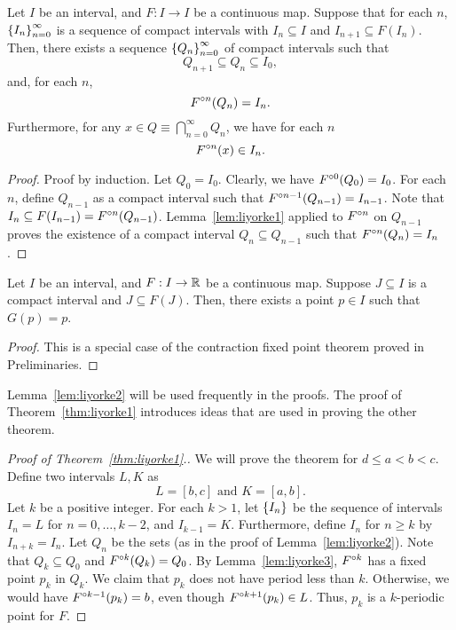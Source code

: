 \documentclass[12pt,draft,twoside]{book}
\begin{document}
\begin{lemma}
  Let $I$ be an interval, and $F: I\to I$ be a continuous map.
  Suppose that for each $n$, $\left \{ I_n \right \}^{\infty}_{n=0}$ is a sequence of compact intervals with $I_n \subseteq I$ and $I_{n+1} \subseteq F(I_n)$.
  Then, there exists a sequence $\left \{ Q_n \right \}^{\infty}_{n=0}$ of compact intervals such that 
  \begin{equation*}
    Q_{n+1} \subseteq Q_{n} \subseteq I_0,
  \end{equation*}
and, for each $n$,
  \begin{equation*}
    F^{\circ n}(Q_n) = I_n.
  \end{equation*}
  Furthermore, for any $x \in Q \equiv \bigcap\limits_{n=0}^{\infty}Q_n$, we have for each $n$
  \begin{equation*}
    F^{\circ n}(x) \in I_n.
  \end{equation*}
  \label{lem:liyorke2}
  \begin{proof}
    Proof by induction.
    Let $Q_0 = I_0$.
    Clearly, we have $F^{\circ 0}(Q_0) = I_0$.
    For each $n$, define $Q_{n-1}$ as a compact interval such that $F^{\circ n-1}(Q_{n-1}) = I_{n-1}$.
    Note that $I_n \subseteq F(I_{n-1}) = F^{\circ n}(Q_{n-1})$.
    Lemma~\ref{lem:liyorke1} applied to $F^{\circ n}$ on $Q_{n-1}$ proves the existence of a compact interval $Q_n \subseteq Q_{n-1}$ such that $F^{\circ n}(Q_n) = I_n$.
  \end{proof}
\end{lemma}

\begin{lemma}
  Let $I$ be an interval, and $F: I\to \mathbb{R}$ be a continuous map.
  Suppose $J \subseteq I$ is a compact interval and $J \subseteq F(J)$. 
  Then, there exists a point $p \in I$ such that $G(p) = p$.
  \begin{proof}
    This is a special case of the contraction fixed point theorem proved in Preliminaries.
  \end{proof}
  \label{lem:liyorke3}
\end{lemma}

Lemma~\ref{lem:liyorke2} will be used frequently in the proofs.
The proof of Theorem~\ref{thm:liyorke1} introduces ideas that are used in proving the other theorem.

\begin{proof}[Proof of Theorem~\ref{thm:liyorke1}.]
  We will prove the theorem for $d \leq a < b < c$.
  Define two intervals $L,K$ as
  \begin{equation*}
    L = [b,c] \mbox{ and } K = [a,b].
  \end{equation*}
  Let $k$ be a positive integer.
  For each $k > 1$, let $\left \{ I_n \right \}$ be the sequence of intervals $I_n = L$ for $n = 0, \ldots, k-2$, and $I_{k-1} = K$.
  Furthermore, define $I_n$ for $n \geq k$ by $I_{n+k} = I_n$.
  Let $Q_n$ be the sets (as in the proof of Lemma~\ref{lem:liyorke2}).
  Note that $Q_k \subseteq Q_0$ and $F^{\circ k}(Q_k) = Q_0$.
  By Lemma~\ref{lem:liyorke3}, $F^{\circ k}$ has a fixed point $p_k$ in $Q_k$.
  We claim that $p_k$ does not have period less than $k$.
  Otherwise, we would have $F^{\circ k-1}(p_k) = b$, even though $F^{\circ k+1}(p_k) \in L$.
  Thus, $p_k$ is a $k$-periodic point for $F$.
\end{proof}
\end{document}
